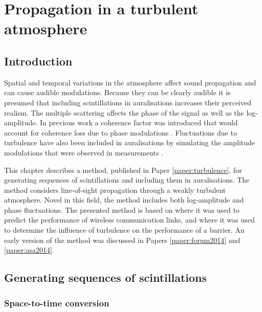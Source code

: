 \chapter{Propagation in a turbulent atmosphere}\label{chapter:turbulence} %

\section{Introduction}
Spatial and temporal variations in the atmosphere affect sound propagation and
can cause audible modulations. Because they can be clearly audible it is
presumed that including scintillations in auralisations increases their
perceived realism. The multiple scattering affects the phase of the signal as
well as the log-amplitude. In previous work a coherence factor was introduced
that would account for coherence loss due to phase modulations \cite{Shin2006,
Arntzen2014b, Arntzen2014a}. Fluctuations due to turbulence have also been
included in auralisations by simulating the amplitude modulations that were
observed in measurements \cite{Heutschi2014, Minard2016}.

This chapter describes a method, published in Paper \ref{paper:turbulence}, for
generating sequences of scintillations and including them in auralisations. The
method considers line-of-sight propagation through a weakly turbulent
atmosphere. Novel in this field, the method includes both log-amplitude and
phase fluctuations. The presented method is based on \cite{Jurado-navas2006}
where it was used to predict the performance of wireless communication links,
and \cite{Forssen2000} where it was used to determine the influence of
turbulence on the performance of a barrier. An early version of the method was
discussed in Papers \ref{paper:forum2014} and \ref{paper:asa2014}.


\section{Generating sequences of scintillations}

\subsection{Space-to-time conversion}

